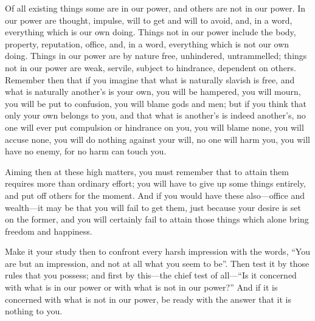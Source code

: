 Of all existing things some are in our  power, and others are not in our power.
In our  power are thought, impulse,  will to get and  will to avoid, and,  in a
word, everything which  is our own doing.  Things not in our  power include the
body, property, reputation, office, and, in a word, everything which is not our
own doing.  Things in our power  are by nature free,  unhindered, untrammelled;
things not in  our power are weak, servile, subject  to hindrance, dependent on
others. Remember  then that if  you imagine that  what is naturally  slavish is
free, and what  is naturally another's is  your own, you will  be hampered, you
will mourn, you will  be put to confusion, you will blame gods  and men; but if
you think  that only your  own belongs  to you, and  that what is  another's is
indeed another's, no one will ever put compulsion or hindrance on you, you will
blame none, you will accuse none, you will do nothing against your will, no one
will harm you, you will have no enemy, for no harm can touch you.

Aiming  then at  these high  matters,  you must  remember that  to attain  them
requires  more than  ordinary effort;  you  will have  to give  up some  things
entirely,  and put  off others  for the  moment. And  if you  would have  these
also---office  and wealth---it  may be  that you  will fail  to get  them, just
because your desire is set on the former, and you will certainly fail to attain
those things which alone bring freedom and happiness.

Make it  your study  then to  confront every harsh  impression with  the words,
``You are but an impression, and not at all what you seem to be''. Then test it
by  those  rules that  you  possess;  and first  by  this---the  chief test  of
all---``Is it concerned  with what is in our  power or with what is  not in our
power?'' And if  it is concerned with what  is not in our power,  be ready with
the answer that it is nothing to you.
